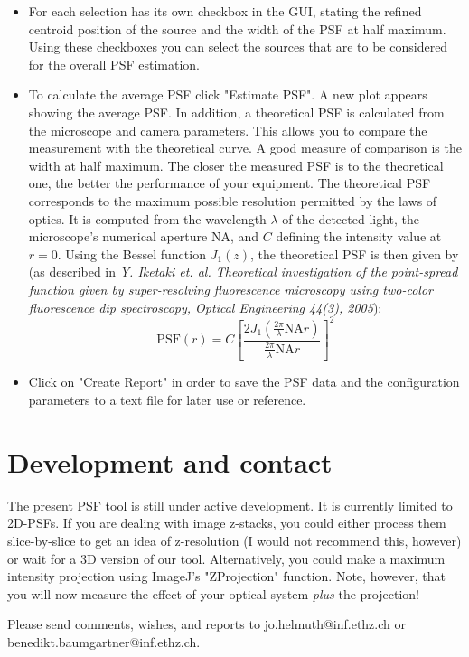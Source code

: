 \begin{itemize}
\item For each selection has its own checkbox in the GUI, stating the refined centroid position of the source and the width of the PSF at half maximum. Using these checkboxes you can select the sources that are to be considered for the overall PSF estimation.
\item To calculate the average PSF click "Estimate PSF". A new plot appears showing the average PSF. In addition, a theoretical PSF is calculated from the microscope and camera parameters. This allows you to compare the measurement with the theoretical curve. A good measure of comparison is the width at half maximum. The closer the measured PSF is to the theoretical one, the better the performance of your equipment. 
The theoretical PSF corresponds to the maximum possible resolution permitted by the laws of optics. It is computed from the wavelength $\lambda$ of the detected light, the microscope's numerical aperture $\mathrm{N\!A}$, and $C$ defining the intensity value at $r = 0$. Using the Bessel function $J_1(z)$, the theoretical PSF is then given by (as described in \textit{Y. Iketaki et. al. Theoretical investigation of the point-spread function given by super-resolving fluorescence microscopy using two-color fluorescence dip spectroscopy, Optical Engineering 44(3), 2005}):
	\[
	\mathrm{PSF}\left(r\right) = C\left[\frac{2J_1\left(\frac{2\pi}{\lambda}\mathrm{N\!A}r\right)}{\frac{2\pi}{\lambda}\mathrm{N\!A}r}\right]^2
\]
%
\item Click on "Create Report" in order to save the PSF data and the configuration parameters to a text file for later use or reference.
\end{itemize}

\section{Development and contact}
The present PSF tool is still under active development. It is currently limited to 2D-PSFs. If you are dealing with image z-stacks, you could either process them slice-by-slice to get an idea of z-resolution (I would not recommend this, however) or wait for a 3D version of our tool. Alternatively, you could make a maximum intensity projection using ImageJ's  "ZProjection" function. Note, however, that you will now measure the effect of your optical system \emph{plus} the projection! 

Please send comments, wishes, and reports to jo.helmuth@inf.ethz.ch or benedikt.baumgartner@inf.ethz.ch.
